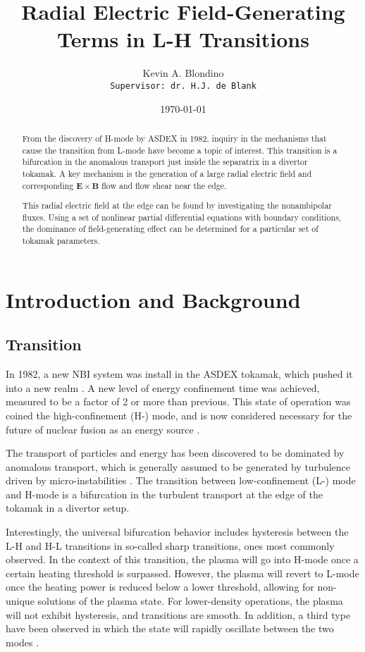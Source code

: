 \documentclass[a4paper]{article}
\author{Kevin A. Blondino \\
	\texttt{Supervisor: dr. H.J. de Blank}}
\title{Radial Electric Field-Generating Terms in L-H Transitions}
\date{\today}
\begin{document}
\maketitle


\begin{abstract}
	From the discovery of H-mode by ASDEX in 1982, inquiry in the mechanisms that cause the transition from L-mode have become a topic of interest.
	This transition is a bifurcation in the anomalous transport just inside the separatrix in a divertor tokamak.
	A key mechanism is the generation of a large radial electric field and corresponding $\mathbf{E}\times\mathbf{B}$ flow and flow shear near the edge.

	This radial electric field at the edge can be found by investigating the nonambipolar fluxes. Using a set of nonlinear partial differential equations with boundary conditions, the dominance of field-generating effect can be determined for a particular set of tokamak parameters.
\end{abstract}

\section{Introduction and Background}
\subsection{Transition}
In 1982, a new NBI system was install in the ASDEX tokamak, which pushed it into a new realm \cite{arnoux_how_2009}.
A new level of energy confinement time was achieved, measured to be a factor of 2 or more than previous.
This state of operation was coined the high-confinement (H-) mode, and is now considered necessary for the future of nuclear fusion as an energy source \cite{wagner_development_1984}.

The transport of particles and energy has been discovered to be dominated by anomalous transport, which is generally assumed to be generated by turbulence driven by micro-instabilities \cite{freidberg_plasma_2007}.
The transition between low-confinement (L-) mode and H-mode is a bifurcation in the turbulent transport at the edge of the tokamak in a divertor setup.

Interestingly, the universal bifurcation behavior includes hysteresis between the L-H and H-L transitions in so-called sharp transitions, ones most commonly observed.
In the context of this transition, the plasma will go into H-mode once a certain heating threshold is surpassed.
However, the plasma will revert to L-mode once the heating power is reduced below a lower threshold, allowing for non-unique solutions of the plasma state.
For lower-density operations, the plasma will not exhibit hysteresis, and transitions are smooth.
In addition, a third type have been observed in which the state will rapidly oscillate between the two modes \cite{weymiens_bifurcation_2014}.
\end{document}
